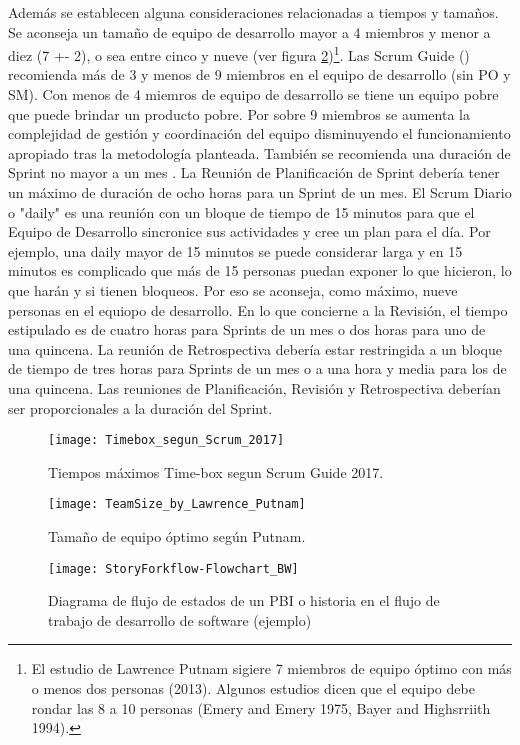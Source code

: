 Además se establecen alguna consideraciones relacionadas a tiempos y tamaños. Se aconseja un tamaño de equipo de desarrollo mayor a 4 miembros y menor a diez (7 +- 2), o sea entre cinco y nueve (ver figura \ref{fig:TeamSize_by_Lawrence_Putnam})\footnote{El estudio de Lawrence Putnam sigiere 7 miembros de equipo óptimo con más o menos dos personas (2013). Algunos estudios dicen que el equipo debe rondar las 8 a 10 personas (Emery and Emery 1975, Bayer and Highsrriith 1994).}. Las Scrum Guide (\cite{Ken-Jeff-2017}) recomienda más de 3 y menos de 9 miembros en el equipo de desarrollo (sin PO y SM). Con menos de 4 miemros de equipo de desarrollo se tiene un equipo pobre que puede brindar un producto pobre. Por sobre 9 miembros se aumenta la complejidad de gestión y coordinación del equipo disminuyendo el funcionamiento apropiado tras la metodología planteada. También se recomienda una duración de Sprint no mayor a un mes \cite{Ken-Jeff-2017}. La Reunión de Planificación de Sprint debería tener un máximo de duración de ocho horas para un Sprint de un mes. El Scrum Diario o "daily" es una reunión con un bloque de tiempo de 15 minutos para que el Equipo de Desarrollo sincronice sus actividades y cree un plan para el día. Por ejemplo, una daily mayor de 15 minutos se puede considerar larga y en 15 minutos es complicado que más de 15 personas puedan exponer lo que hicieron, lo que harán y si tienen bloqueos. Por eso se aconseja, como máximo, nueve personas en el equiopo de desarrollo. En lo que concierne a la Revisión, el tiempo estipulado es de cuatro horas para Sprints de un mes o dos horas para uno de una quincena. La reunión de Retrospectiva  debería estar restringida a un bloque de tiempo de tres horas para Sprints de un mes o a una hora y media para los de una quincena. Las reuniones de Planificación, Revisión y Retrospectiva deberían ser proporcionales a la duración del Sprint.

\begin{figure}[h]
  \centering
  \texttt{[image: Timebox\_segun\_Scrum\_2017]}
  \caption{Tiempos máximos Time-box segun Scrum Guide 2017.}
  \centering
  \label{fig:Timebox_segun_Scrum_2017} 
\end{figure}
\FloatBarrier

\begin{figure}[h]
  \centering
  \texttt{[image: TeamSize\_by\_Lawrence\_Putnam]}
  \caption{Tamaño de equipo óptimo según Putnam.}
  \centering
  \label{fig:TeamSize_by_Lawrence_Putnam} 
\end{figure}
\FloatBarrier

\begin{figure}[h]
  \centering
  \texttt{[image: StoryForkflow-Flowchart\_BW]}
  \caption{Diagrama de flujo de estados de un PBI o historia en el flujo de trabajo de desarrollo de software (ejemplo)}
  \centering
  \label{fig:StoryForkflow-Flowchart_BW} 
\end{figure}
\FloatBarrier
